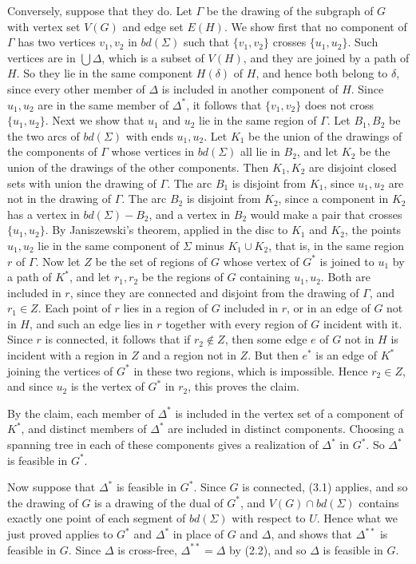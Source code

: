 {Conversely, suppose that they do. Let $\Gamma$ be the drawing of the subgraph of $G$ with vertex set
$V(G)$ and edge set $E(H)$. We show first that no component of $\Gamma$ has two vertices $v_1, v_2$ in
$bd(\Sigma)$ such that $\{v_1, v_2\}$ crosses $\{u_1, u_2\}$. Such vertices are in
$\bigcup \Delta$, which is a subset of $V(H)$, and they are joined by a path of $H$. So they lie in
the same component $H(\delta)$ of $H$, and hence both belong to $\delta$, since every other member of
$\Delta$ is included in another component of $H$. Since $u_1, u_2$ are in the same member of
$\Delta^*$, it follows that $\{v_1, v_2\}$ does not cross $\{u_1, u_2\}$. Next we show that $u_1$ and
$u_2$ lie in the same region of $\Gamma$. Let $B_1, B_2$ be the two arcs of $bd(\Sigma)$ with ends
$u_1, u_2$. Let $K_1$ be the union of the drawings of the components of $\Gamma$ whose vertices in
$bd(\Sigma)$ all lie in $B_2$, and let $K_2$ be the union of the drawings of the other components.
Then $K_1, K_2$ are disjoint closed sets with union the drawing of $\Gamma$. The arc $B_1$ is disjoint
from $K_1$, since $u_1, u_2$ are not in the drawing of $\Gamma$. The arc $B_2$ is disjoint from
$K_2$, since a component in $K_2$ has a vertex in $bd(\Sigma) - B_2$, and a vertex in $B_2$ would make
a pair that crosses $\{u_1, u_2\}$. By Janiszewski's theorem, applied in the disc to $K_1$ and $K_2$,
the points $u_1, u_2$ lie in the same component of $\Sigma$ minus $K_1 \cup K_2$, that is, in the same
region $r$ of $\Gamma$. Now let $Z$ be the set of regions of $G$ whose vertex of $G^*$ is joined to
$u_1$ by a path of $K^*$, and let $r_1, r_2$ be the regions of $G$ containing $u_1, u_2$. Both are
included in $r$, since they are connected and disjoint from the drawing of $\Gamma$, and $r_1 \in Z$.
Each point of $r$ lies in a region of $G$ included in $r$, or in an edge of $G$ not in $H$, and such an
edge lies in $r$ together with every region of $G$ incident with it. Since $r$ is connected, it
follows that if $r_2 \notin Z$, then some edge $e$ of $G$ not in $H$ is incident with a region in $Z$
and a region not in $Z$. But then $e^*$ is an edge of $K^*$ joining the vertices of $G^*$ in these
two regions, which is impossible. Hence $r_2 \in Z$, and since $u_2$ is the vertex of $G^*$ in $r_2$,
this proves the claim.

By the claim, each member of $\Delta^*$ is included in the vertex set of a component of $K^*$, and
distinct members of $\Delta^*$ are included in distinct components. Choosing a spanning tree in each
of these components gives a realization of $\Delta^*$ in $G^*$. So $\Delta^*$ is feasible in $G^*$.

Now suppose that $\Delta^*$ is feasible in $G^*$. Since $G$ is connected, (3.1) applies, and so the
drawing of $G$ is a drawing of the dual of $G^*$, and $V(G) \cap bd(\Sigma)$ contains exactly one
point of each segment of $bd(\Sigma)$ with respect to $U$. Hence what we just proved applies to $G^*$
and $\Delta^*$ in place of $G$ and $\Delta$, and shows that $\Delta^{**}$ is feasible in $G$. Since
$\Delta$ is cross-free, $\Delta^{**} = \Delta$ by (2.2), and so $\Delta$ is feasible in
$G$.}

